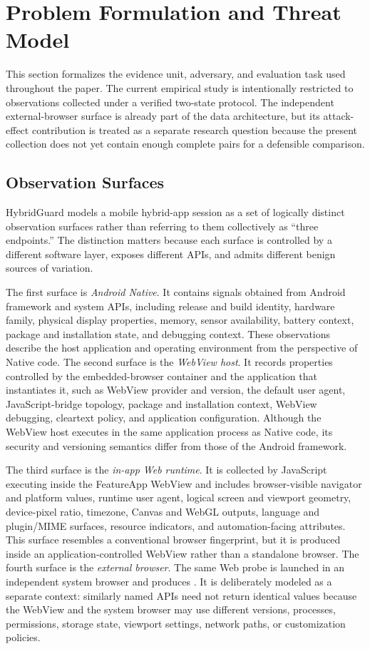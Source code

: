 \section{Problem Formulation and Threat Model}
\label{sec:problem}

This section formalizes the evidence unit, adversary, and evaluation task used throughout the paper. The current empirical study is intentionally restricted to \appfp observations collected under a verified two-state protocol. The independent external-browser surface is already part of the data architecture, but its attack-effect contribution is treated as a separate research question because the present collection does not yet contain enough complete \browserfp pairs for a defensible comparison.

\subsection{Observation Surfaces}

HybridGuard models a mobile hybrid-app session as a set of logically distinct observation surfaces rather than referring to them collectively as ``three endpoints.'' The distinction matters because each surface is controlled by a different software layer, exposes different APIs, and admits different benign sources of variation.

The first surface is \emph{Android Native}. It contains signals obtained from Android framework and system APIs, including release and build identity, hardware family, physical display properties, memory, sensor availability, battery context, package and installation state, and debugging context. These observations describe the host application and operating environment from the perspective of Native code. The second surface is the \emph{WebView host}. It records properties controlled by the embedded-browser container and the application that instantiates it, such as WebView provider and version, the default user agent, JavaScript-bridge topology, package and installation context, WebView debugging, cleartext policy, and application configuration. Although the WebView host executes in the same application process as Native code, its security and versioning semantics differ from those of the Android framework.

The third surface is the \emph{in-app Web runtime}. It is collected by JavaScript executing inside the FeatureApp WebView and includes browser-visible navigator and platform values, runtime user agent, logical screen and viewport geometry, device-pixel ratio, timezone, Canvas and WebGL outputs, language and plugin/MIME surfaces, resource indicators, and automation-facing attributes. This surface resembles a conventional browser fingerprint, but it is produced inside an application-controlled WebView rather than a standalone browser. The fourth surface is the \emph{external browser}. The same Web probe is launched in an independent system browser and produces \browserfp. It is deliberately modeled as a separate context: similarly named APIs need not return identical values because the WebView and the system browser may use different versions, processes, permissions, storage state, viewport settings, network paths, or customization policies.

